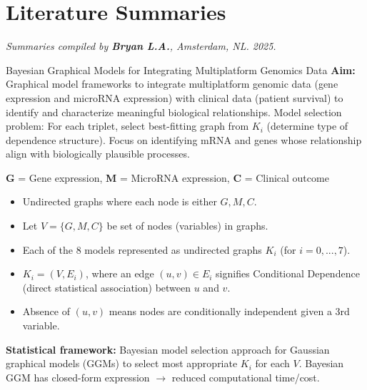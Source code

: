 \documentclass[twocolumn]{article}
\begin{document}
\section*{Literature Summaries}
\vspace{0em} %
    \large\textit{Summaries compiled by \textbf{Bryan L.A.}, Amsterdam, NL. 2025.} %
\vspace{1em} %

\begin{literaturepaper}{Bayesian Graphical Models for Integrating Multiplatform Genomics Data \cite{Wang_Baladandayuthapani_Holmes_Do_2013}}
\label{paper-summary-1} %
\small
    \textbf{Aim:} Graphical model frameworks to integrate multiplatform genomic data (gene expression and microRNA expression) with clinical data (patient survival) to identify and characterize meaningful biological relationships. Model selection problem: For each triplet, select best-fitting graph from $K_i$ (determine type of dependence structure). Focus on identifying mRNA and genes whose relationship align with biologically plausible processes.

    \textbf{G} = Gene expression, \textbf{M} = MicroRNA expression, \textbf{C} = Clinical outcome
    
    \begin{itemize}[label=$\circ$]
        \item Undirected graphs where each node is either $G, M, C$.
        \item Let $V = \{G,M,C\}$ be set of nodes (variables) in graphs.
        \item Each of the 8 models represented as undirected graphs $K_i$ (for $i = 0,...,7$).
        \item $K_i = (V, E_i)$, where an edge $(u, v) \in E_i$ signifies Conditional Dependence (direct statistical association) between $u$ and $v$.
        \item Absence of $(u, v)$ means nodes are conditionally independent given a 3rd variable.
    \end{itemize}

    \textbf{Statistical framework:} Bayesian model selection approach for Gaussian graphical models (GGMs) to select most appropriate $K_i$ for each $V$. Bayesian GGM has closed-form expression $\to$ reduced computational time/cost.


\end{literaturepaper}
\end{document}
